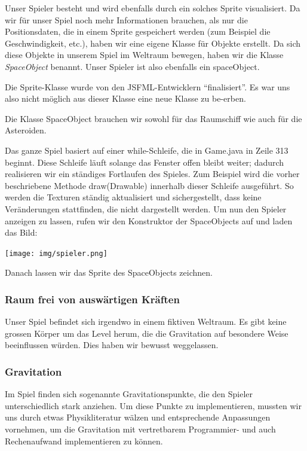 \documentclass[12pt,a4paper]{scrartcl}
\newcommand{\q}[1]{``#1''}
\begin{document}
Unser Spieler besteht und wird ebenfalls durch ein solches Sprite visualisiert.
Da wir für unser Spiel noch mehr Informationen brauchen, als nur die Positionsdaten, die in einem
Sprite gespeichert werden (zum Beispiel die Geschwindigkeit, etc.), haben wir eine eigene Klasse für Objekte erstellt. Da sich diese Objekte
in unserem Spiel im Weltraum bewegen, haben wir die Klasse \textit{SpaceObject} benannt. Unser Spieler ist also ebenfalls ein spaceObject.

Die Sprite-Klasse wurde von den JSFML-Entwicklern \q{finalisiert}. Es war uns also nicht
möglich aus dieser Klasse eine neue Klasse zu be-erben.


Die Klasse SpaceObject brauchen wir sowohl für das Raumschiff wie auch für die Asteroiden.


Das ganze Spiel basiert auf einer while-Schleife, die in Game.java in Zeile 313 beginnt.
Diese Schleife läuft solange das Fenster offen bleibt weiter; dadurch realisieren wir ein ständiges Fortlaufen des Spieles.
Zum Beispiel wird die vorher beschriebene Methode draw(Drawable) innerhalb dieser Schleife ausgeführt.
So werden die Texturen ständig aktualisiert und sichergestellt, dass keine Veränderungen stattfinden, die nicht dargestellt werden.
Um nun den Spieler anzeigen zu lassen, rufen wir den Konstruktor der SpaceObjects auf und laden das Bild: 	\\

\begin{center}
\texttt{[image: img/spieler.png]}
\end{center}

Danach lassen wir das Sprite des SpaceObjects zeichnen.




\subsubsection{Raum frei von auswärtigen Kräften}
Unser Spiel befindet sich irgendwo in einem fiktiven Weltraum. Es gibt keine grossen Körper um das
Level herum, die die Gravitation auf besondere Weise beeinflussen würden. Dies haben wir bewusst weggelassen.


\subsubsection{Gravitation}
Im Spiel finden sich sogenannte Gravitationspunkte, die den Spieler unterschiedlich stark anziehen.
Um diese Punkte zu implementieren, mussten wir uns durch etwas Physikliteratur wälzen und entsprechende
Anpassungen vornehmen, um die Gravitation mit vertretbarem Programmier- und auch Rechenaufwand implementieren zu können.  \\
\end{document}
